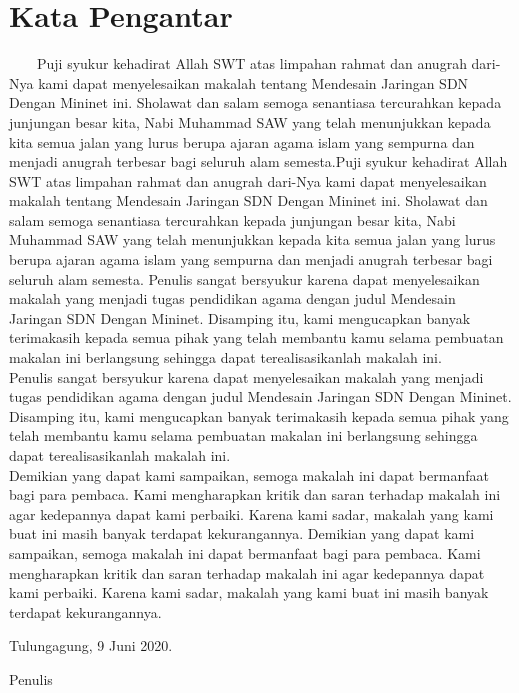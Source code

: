 \section{Kata Pengantar}

\ \ \ \  Puji syukur kehadirat Allah SWT atas limpahan rahmat dan anugrah dari-Nya kami dapat menyelesaikan
makalah tentang Mendesain Jaringan SDN Dengan Mininet ini. Sholawat dan salam semoga senantiasa tercurahkan
kepada junjungan besar kita, Nabi Muhammad SAW yang telah menunjukkan kepada kita semua jalan yang lurus berupa ajaran
agama islam yang sempurna dan menjadi anugrah terbesar bagi seluruh alam semesta.Puji syukur kehadirat Allah SWT
atas limpahan rahmat dan anugrah dari-Nya kami dapat menyelesaikan makalah tentang Mendesain Jaringan SDN Dengan
Mininet ini. Sholawat dan salam semoga senantiasa tercurahkan kepada junjungan besar kita, Nabi Muhammad SAW yang
telah menunjukkan kepada kita semua jalan yang lurus berupa ajaran agama islam yang sempurna dan menjadi anugrah
terbesar bagi seluruh alam semesta.
Penulis sangat bersyukur karena dapat menyelesaikan makalah yang menjadi tugas pendidikan agama dengan
judul Mendesain Jaringan SDN Dengan Mininet. Disamping itu, kami mengucapkan banyak terimakasih kepada semua
pihak yang telah membantu kamu selama pembuatan makalan ini berlangsung sehingga dapat terealisasikanlah makalah
ini. \\

Penulis sangat bersyukur karena dapat menyelesaikan makalah yang menjadi tugas pendidikan agama dengan judul
Mendesain Jaringan SDN Dengan Mininet. Disamping itu, kami mengucapkan banyak terimakasih kepada semua pihak yang
telah membantu kamu selama pembuatan makalan ini berlangsung sehingga dapat terealisasikanlah makalah ini.\\

Demikian yang dapat kami sampaikan, semoga makalah ini dapat bermanfaat bagi para pembaca. Kami
mengharapkan kritik dan saran terhadap makalah ini agar kedepannya dapat kami perbaiki. Karena kami sadar, makalah yang
kami buat ini masih banyak terdapat kekurangannya. Demikian yang dapat kami sampaikan, semoga makalah ini dapat
bermanfaat bagi para pembaca. Kami mengharapkan kritik dan saran terhadap makalah ini agar kedepannya dapat kami
perbaiki. Karena kami sadar, makalah yang kami buat ini masih banyak terdapat kekurangannya.

\begin{flushright}
Tulungagung, 9 Juni 2020.

\bigskip

Penulis 
\end{flushright}
